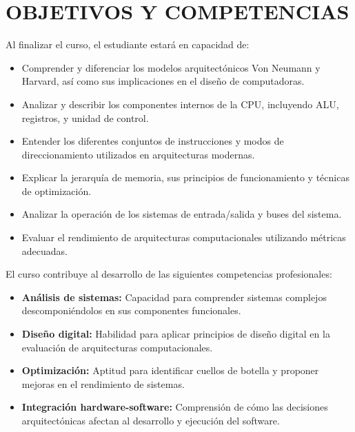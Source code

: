 \documentclass[12pt,a4paper]{article}
\begin{document}
\section{OBJETIVOS Y COMPETENCIAS}

\begin{objetivos}
Al finalizar el curso, el estudiante estará en capacidad de:
\begin{itemize}[leftmargin=*]
    \item Comprender y diferenciar los modelos arquitectónicos Von Neumann y Harvard, así como sus implicaciones en el diseño de computadoras.
    \item Analizar y describir los componentes internos de la CPU, incluyendo ALU, registros, y unidad de control.
    \item Entender los diferentes conjuntos de instrucciones y modos de direccionamiento utilizados en arquitecturas modernas.
    \item Explicar la jerarquía de memoria, sus principios de funcionamiento y técnicas de optimización.
    \item Analizar la operación de los sistemas de entrada/salida y buses del sistema.
    \item Evaluar el rendimiento de arquitecturas computacionales utilizando métricas adecuadas.
\end{itemize}
\end{objetivos}

\begin{competencias}
El curso contribuye al desarrollo de las siguientes competencias profesionales:
\begin{itemize}[leftmargin=*]
    \item \textbf{Análisis de sistemas:} Capacidad para comprender sistemas complejos descomponiéndolos en sus componentes funcionales.
    \item \textbf{Diseño digital:} Habilidad para aplicar principios de diseño digital en la evaluación de arquitecturas computacionales.
    \item \textbf{Optimización:} Aptitud para identificar cuellos de botella y proponer mejoras en el rendimiento de sistemas.
    \item \textbf{Integración hardware-software:} Comprensión de cómo las decisiones arquitectónicas afectan al desarrollo y ejecución del software.
\end{itemize}
\end{competencias}
\vspace{0.5cm}
\end{document}
